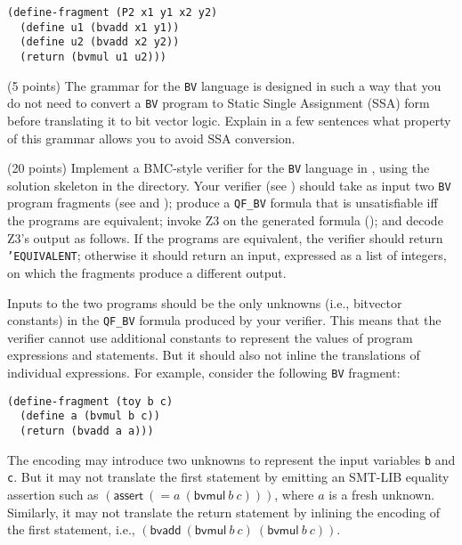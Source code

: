 \documentclass{handout}
\begin{document}
\begin{lstlisting}
(define-fragment (P2 x1 y1 x2 y2)
  (define u1 (bvadd x1 y1))
  (define u2 (bvadd x2 y2))
  (return (bvmul u1 u2)))
\end{lstlisting}


\begin{questions}

\item (5 points) \label{prob:bvv:first} The grammar for the \texttt{BV} language
is designed in such a way that you do not need to convert a \texttt{BV} program
to Static Single Assignment (SSA) form before translating it to bit vector
logic.  Explain in a few sentences what property of this grammar allows you to
avoid SSA conversion.




\item (20 points) \label{prob:bvv:last} Implement a BMC-style verifier for the
\texttt{BV} language in \racket, using the solution skeleton in the 
directory. Your verifier (see ) should take as input two
\texttt{BV} program fragments (see  and
); produce a  \texttt{QF\_BV} formula that is unsatisfiable
iff  the programs are equivalent; invoke Z3 on the generated formula
(); and decode Z3's output as follows.  If the programs
are equivalent, the verifier should return \texttt{'EQUIVALENT}; otherwise it
should return an input, expressed as a list of integers, on which the fragments
produce a different output.

Inputs to the two programs should be the only unknowns (i.e., bitvector
constants) in the \texttt{QF\_BV} formula produced by your verifier.  This means
that the verifier cannot use additional constants to represent the values of
program expressions and statements.  But it should also not inline the
translations of individual expressions.  For example, consider the following
\texttt{BV} fragment:


\begin{lstlisting}
(define-fragment (toy b c)
  (define a (bvmul b c))
  (return (bvadd a a)))
\end{lstlisting}
\label{prob:impl}

The encoding may introduce two unknowns to represent the input variables
\texttt{b} and \texttt{c}.  But it may not translate the first statement by
emitting an SMT-LIB equality assertion such as $(\mathsf{assert}\ (= a\
(\mathsf{bvmul}\ b\ c)))$, where $a$ is a fresh unknown.  Similarly, it may not
translate the return statement by inlining the encoding of the first statement,
i.e., $(\mathsf{bvadd}\ (\mathsf{bvmul}\ b\ c)\ (\mathsf{bvmul}\ b\ c))$.


\end{questions}
\end{document}

